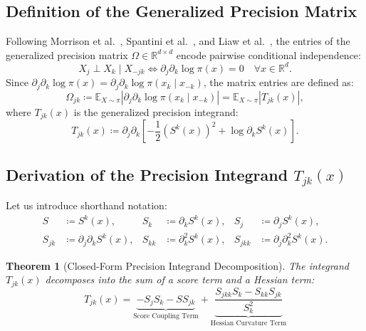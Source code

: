 \documentclass[11pt,a4paper]{article}
\theoremstyle{plain}
\newtheorem{theorem}{Theorem}[section]
\theoremstyle{definition}
\theoremstyle{remark}
\begin{document}
\subsection{Definition of the Generalized Precision Matrix}

Following Morrison et al.\ \cite{morrison2017beyond}, Spantini et al.\ \cite{spantini2018inference}, and Liaw et al.\ \cite{liaw2025learning}, the entries of the generalized precision matrix $\Omega \in \mathbb{R}^{d \times d}$ encode pairwise conditional independence:
\begin{equation}
    X_j \perp X_k \mid X_{-jk} \iff \partial_j \partial_k \log \pi(x) = 0 \quad \forall x \in \mathbb{R}^d.
\end{equation}
Since $\partial_j \partial_k \log \pi(x) = \partial_j \partial_k \log \pi(x_k \mid x_{-k})$, the matrix entries are defined as:
\begin{equation}
    \Omega_{jk} \coloneqq \mathbb{E}_{X \sim \pi} \left| \partial_j \partial_k \log \pi(x_k \mid x_{-k}) \right| = \mathbb{E}_{X \sim \pi} \left| T_{jk}(x) \right|,
\end{equation}
where $T_{jk}(x)$ is the generalized precision integrand:
\begin{equation}
    T_{jk}(x) \coloneqq \partial_j \partial_k \left[ -\frac{1}{2} \left(S^k(x)\right)^2 + \log \partial_k S^k(x) \right].
\end{equation}

\subsection{Derivation of the Precision Integrand \texorpdfstring{$T_{jk}(x)$}{Tjk(x)}}

Let us introduce shorthand notation:
\begin{align*}
    S &\coloneqq S^k(x), & S_k &\coloneqq \partial_k S^k(x), & S_j &\coloneqq \partial_j S^k(x), \\
    S_{jk} &\coloneqq \partial_j \partial_k S^k(x), & S_{kk} &\coloneqq \partial_k^2 S^k(x), & S_{jkk} &\coloneqq \partial_j \partial_k^2 S^k(x).
\end{align*}

\begin{theorem}[Closed-Form Precision Integrand Decomposition]
The integrand $T_{jk}(x)$ decomposes into the sum of a score term and a Hessian term:
\begin{equation}
    \boxed{T_{jk}(x) = \underbrace{- S_j S_k - S S_{jk}}_{\text{Score Coupling Term}} + \underbrace{\frac{S_{jkk} S_k - S_{kk} S_{jk}}{S_k^2}}_{\text{Hessian Curvature Term}}}
    \label{eq:precision_integrand_formula}
\end{equation}
\end{theorem}
\end{document}
